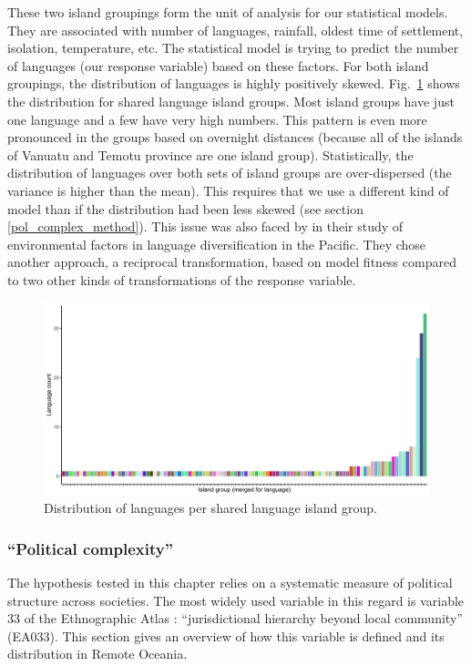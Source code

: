 \documentclass[a4paper,10pt]{article} %
\begin{document}
These two island groupings form the unit of analysis for our statistical models. They are associated with number of languages, rainfall, oldest time of settlement, isolation, temperature, etc. The statistical model is trying to predict the number of languages (our response variable) based on these factors. For both island groupings, the distribution of languages is highly positively skewed. Fig.~\ref{dist_lg_medium} shows the distribution for shared language island groups. Most island groups have just one language and a few have very high numbers. This pattern is even more pronounced in the groups based on overnight distances (because all of the islands of Vanuatu and Temotu province are one island group). Statistically, the distribution of languages over both sets of island groups are over-dispersed (the variance is higher than the mean).
This requires that we use a different kind of model than if the distribution had been less skewed (see section \ref{pol_complex_method}). This issue was also faced by \citet{gavin2012island} in their study of environmental factors in language diversification in the Pacific. They chose another approach, a reciprocal transformation, based on model fitness compared to two other kinds of transformations of the response variable.

\begin{figure}[H]
\centering
\includegraphics[width=13cm]{illustrations/plots_from_R/Lg_distrubition_medium_island_group_lg_merged.png}
\caption{{Distribution of languages per shared language island group.}}
\label{dist_lg_medium}
\end{figure}

\subsubsection{``Political complexity''}
\label{prediting:sec:pol:complex}
The hypothesis tested in this chapter relies on a systematic measure of political structure across societies. The most widely used variable in this regard is variable 33 of the Ethnographic Atlas \citep{EA_1971}: ``jurisdictional hierarchy beyond local community'' (EA033). This section gives an overview of how this variable is defined and its distribution in Remote Oceania. 
\end{document}
